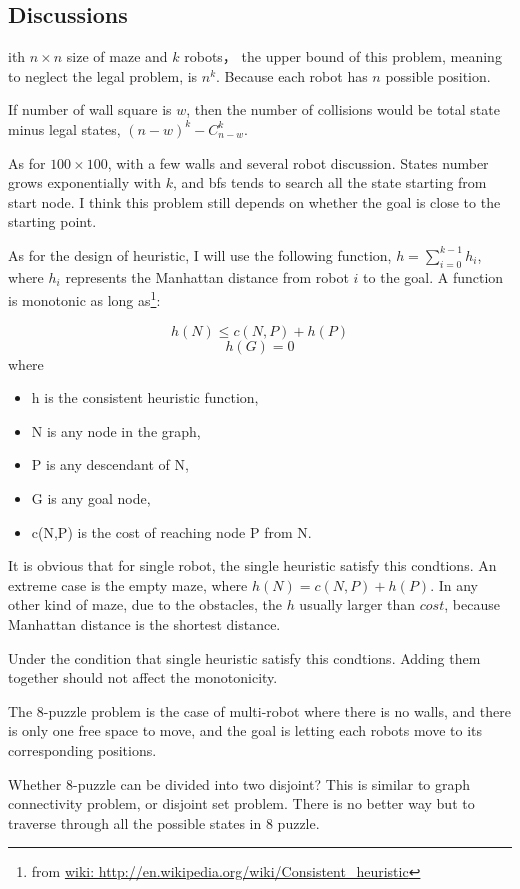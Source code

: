 \documentclass{article}
\begin{document}
\subsection{Discussions}
ith $n\times n$ size of maze and $k$ robots， the upper bound of this problem, meaning to neglect the legal problem, is $n^k$. Because each robot has $n$ possible position.

If number of wall square is $w$, then the number of collisions would be total state minus legal states, $(n-w)^k - C_{n-w}^k$.

As for $100\times100$, with a few walls and several robot discussion. States number grows exponentially with $k$, and bfs tends to search all the state starting from start node. I think this problem still depends on whether the goal is close to the starting point.

As for the design of heuristic, I will use the following function,
$h = \sum^{k-1}_{i=0}h_i$, where $h_i$ represents the Manhattan distance from robot $i$ to the goal. A function is monotonic as long as\footnote{from \url{wiki: http://en.wikipedia.org/wiki/Consistent_heuristic}}:

$$h(N) \leq c(N,P)+h(P) $$
$$h(G)=0$$
where

\begin{itemize}
\item h is the consistent heuristic function,
\item N is any node in the graph,
\item P is any descendant of N,
\item G is any goal node,
\item c(N,P) is the cost of reaching node P from N.
\end{itemize}

It is obvious that for single robot, the single heuristic satisfy this condtions. An extreme case is the empty maze, where $h(N) = c(N,P)+h(P) $. In any other kind of maze, due to the obstacles, the $h$ usually larger than $cost$, because Manhattan distance is the shortest distance.

Under the condition that single heuristic satisfy this condtions. Adding them together should not affect the monotonicity.

The 8-puzzle problem is the case of multi-robot where there is no walls, and there is only one free space to move, and the goal is letting each robots move to its corresponding positions.

Whether 8-puzzle can be divided into two disjoint? This is similar to graph connectivity problem, or disjoint set problem. There is no better way but to traverse through all the possible states in 8 puzzle.
\end{document}
